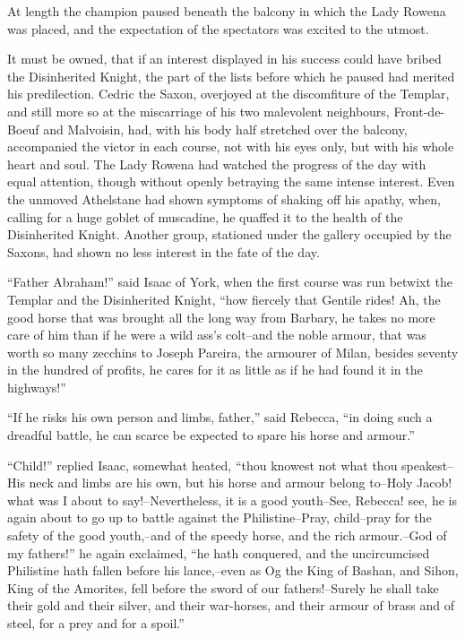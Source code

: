 At length the champion paused beneath the balcony in which the Lady
Rowena was placed, and the expectation of the spectators was excited to
the utmost.

It must be owned, that if an interest displayed in his success could
have bribed the Disinherited Knight, the part of the lists before which
he paused had merited his predilection. Cedric the Saxon, overjoyed at
the discomfiture of the Templar, and still more so at the miscarriage of
his two malevolent neighbours, Front-de-Boeuf and Malvoisin, had, with
his body half stretched over the balcony, accompanied the victor in each
course, not with his eyes only, but with his whole heart and soul. The
Lady Rowena had watched the progress of the day with equal attention,
though without openly betraying the same intense interest. Even the
unmoved Athelstane had shown symptoms of shaking off his apathy, when,
calling for a huge goblet of muscadine, he quaffed it to the health of
the Disinherited Knight. Another group, stationed under the gallery
occupied by the Saxons, had shown no less interest in the fate of the
day.

``Father Abraham!'' said Isaac of York, when the first course was run
betwixt the Templar and the Disinherited Knight, ``how fiercely that
Gentile rides! Ah, the good horse that was brought all the long way from
Barbary, he takes no more care of him than if he were a wild ass's
colt--and the noble armour, that was worth so many zecchins to Joseph
Pareira, the armourer of Milan, besides seventy in the hundred of
profits, he cares for it as little as if he had found it in the
highways!''

``If he risks his own person and limbs, father,'' said Rebecca, ``in
doing such a dreadful battle, he can scarce be expected to spare his
horse and armour.''

``Child!'' replied Isaac, somewhat heated, ``thou knowest not what thou
speakest--His neck and limbs are his own, but his horse and armour
belong to--Holy Jacob! what was I about to say!--Nevertheless, it is a
good youth--See, Rebecca! see, he is again about to go up to battle
against the Philistine--Pray, child--pray for the safety of the good
youth,--and of the speedy horse, and the rich armour.--God of my
fathers!'' he again exclaimed, ``he hath conquered, and the
uncircumcised Philistine hath fallen before his lance,--even as Og the
King of Bashan, and Sihon, King of the Amorites, fell before the sword
of our fathers!--Surely he shall take their gold and their silver, and
their war-horses, and their armour of brass and of steel, for a prey and
for a spoil.''

